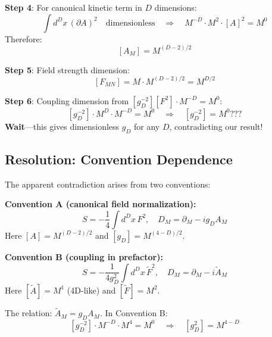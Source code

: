 \documentclass[11pt,a4paper]{article}
\begin{document}
\textbf{Step 4}: For canonical kinetic term in $D$ dimensions:
\begin{equation}
\label{eq:app-canonical}
\int d^D x\, (\partial A)^2 \quad \text{dimensionless} \quad \Rightarrow \quad
M^{-D} \cdot M^2 \cdot [A]^2 = M^0
\end{equation}
Therefore:
\begin{equation}
\label{eq:app-A-dim}
\boxed{[A_M] = M^{(D-2)/2}}
\end{equation}

\textbf{Step 5}: Field strength dimension:
\begin{equation}
\label{eq:app-F-dim}
\boxed{[F_{MN}] = M \cdot M^{(D-2)/2} = M^{D/2}}
\end{equation}

\textbf{Step 6}: Coupling dimension from $[g_D^{-2}][F^2] \cdot M^{-D} = M^0$:
\begin{equation}
\label{eq:app-g-dim}
[g_D^{-2}] \cdot M^D \cdot M^{-D} = M^0 \quad \Rightarrow \quad [g_D^{-2}] = M^0???
\end{equation}
\textbf{Wait}---this gives dimensionless $g_D$ for any $D$, contradicting our result!

\subsection{Resolution: Convention Dependence}

The apparent contradiction arises from two conventions:

\textbf{Convention A (canonical field normalization):}
\begin{equation}
\label{eq:app-conv-A}
S = -\frac{1}{4} \int d^D x\, F^2, \quad D_M = \partial_M - i g_D A_M
\end{equation}
Here $[A] = M^{(D-2)/2}$ and $[g_D] = M^{(4-D)/2}$.

\textbf{Convention B (coupling in prefactor):}
\begin{equation}
\label{eq:app-conv-B}
S = -\frac{1}{4g_D^2} \int d^D x\, \tilde{F}^2, \quad D_M = \partial_M - i \tilde{A}_M
\end{equation}
Here $[\tilde{A}] = M^1$ (4D-like) and $[\tilde{F}] = M^2$.

The relation: $\tilde{A}_M = g_D A_M$. In Convention B:
\begin{equation}
\label{eq:app-conv-B-check}
[g_D^{-2}] \cdot M^{-D} \cdot M^4 = M^0 \quad \Rightarrow \quad [g_D^2] = M^{4-D}
\end{equation}
\end{document}

